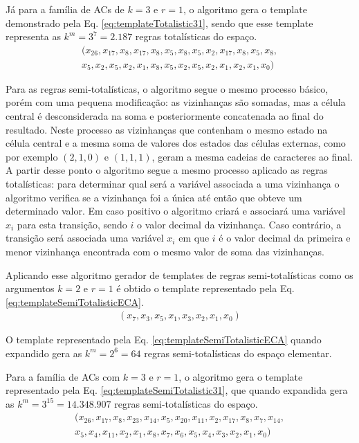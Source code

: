 Já para a família de ACs de $k=3$ e $r=1$, o algoritmo gera o template demonstrado pela Eq. \eqref{eq:templateTotalistic31}, sendo que esse template representa as $k^m = 3^7 = 2.187$ regras totalísticas do espaço.
\begin{equation}
\begin{split}
(x_{26},x_{17},x_8,x_{17},x_8,x_5,x_8,x_5,x_2,x_{17},x_8,x_5,x_8,\\
x_5,x_2,x_5,x_2,x_1,x_8,x_5,x_2,x_5,x_2,x_1,x_2,x_1,x_0)
\label{eq:templateTotalistic31}
\end{split}
\end{equation}

Para as regras semi-totalísticas, o algoritmo segue o mesmo processo básico, porém com uma pequena modificação: as vizinhanças são somadas, mas a célula central é desconsiderada na soma e posteriormente concatenada ao final do resultado. Neste processo as vizinhanças que contenham o mesmo estado na célula central e a mesma soma de valores dos estados das células externas, como por exemplo $(2,1,0)$ e $(1,1,1)$, geram a mesma cadeias de caracteres ao final. A partir desse ponto o algoritmo segue a mesmo processo aplicado as regras totalísticas: para determinar qual será a variável associada a uma vizinhança o algoritmo verifica se a vizinhança foi a única até então que obteve um determinado valor. Em caso positivo o algoritmo criará e associará uma variável $x_i$ para esta transição, sendo $i$ o valor decimal da vizinhança. Caso contrário, a transição será associada uma variável $x_i$ em que $i$ é o valor decimal da primeira e menor vizinhança encontrada com o mesmo valor de soma das vizinhanças.

Aplicando esse algoritmo gerador de templates de regras semi-totalísticas como os argumentos $k=2$ e $r=1$ é obtido o template representado pela Eq. \eqref{eq:templateSemiTotalisticECA}.
\begin{equation}
\begin{split}
(x_7,x_3,x_5,x_1,x_3,x_2,x_1,x_0)
\label{eq:templateSemiTotalisticECA}
\end{split}
\end{equation}

O template representado pela Eq. \eqref{eq:templateSemiTotalisticECA} quando expandido gera as $k^m = 2^6 = 64$ regras semi-totalísticas do espaço elementar.

Para a família de ACs com $k=3$ e $r=1$, o algoritmo gera o template representado pela Eq. \eqref{eq:templateSemiTotalistic31}, que quando expandida gera as $k^m = 3^{15} = 14.348.907$ regras semi-totalísticas do espaço.
\begin{equation}
\begin{split}
(x_{26},x_{17},x_8,x_{23},x_{14},x_5,x_{20},x_{11},x_2,x_{17},x_8,x_7,x_{14},\\
x_5,x_4,x_{11},x_2,x_1,x_8,x_7,x_6,x_5,x_4,x_3,x_2,x_1,x_0)
\label{eq:templateSemiTotalistic31}
\end{split}
\end{equation}